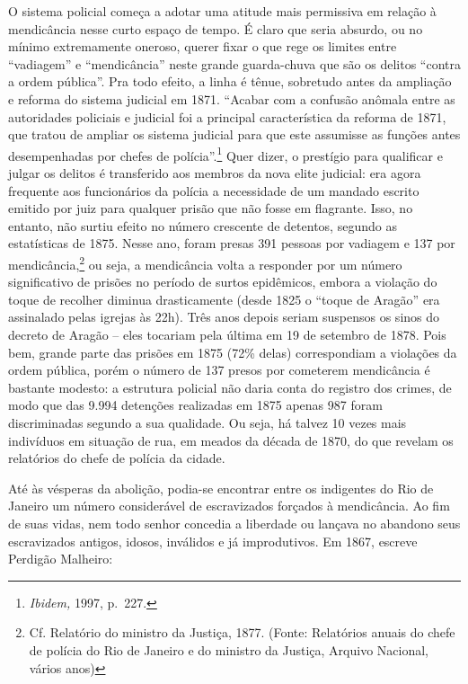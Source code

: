 O sistema policial começa a adotar uma atitude mais permissiva em
relação à mendicância nesse curto espaço de tempo. É claro que seria
absurdo, ou no mínimo extremamente oneroso, querer fixar o que rege os
limites entre ``vadiagem'' e ``mendicância'' neste grande guarda-chuva
que são os delitos ``contra a ordem pública''. Pra todo efeito, a linha
é tênue, sobretudo antes da ampliação e reforma do sistema judicial em
1871. ``Acabar com a confusão anômala entre as autoridades policiais e
judicial foi a principal característica da reforma de 1871, que tratou
de ampliar os sistema judicial para que este assumisse as funções antes
desempenhadas por chefes de polícia''.\footnote{\emph{Ibidem,} 1997,
  p.~227.} Quer dizer, o prestígio para qualificar e julgar os delitos é
transferido aos membros da nova elite judicial: era agora frequente aos
funcionários da polícia a necessidade de um mandado escrito emitido por
juiz para qualquer prisão que não fosse em flagrante. Isso, no entanto,
não surtiu efeito no número crescente de detentos, segundo as
estatísticas de 1875. Nesse ano, foram presas 391 pessoas por vadiagem e
137 por mendicância,\footnote{Cf. Relatório do ministro da Justiça,
  1877. (Fonte: Relatórios anuais do chefe de polícia do Rio de Janeiro
  e do ministro da Justiça, Arquivo Nacional, vários anos)} ou seja, a
mendicância volta a responder por um número significativo de prisões no
período de surtos epidêmicos, embora a violação do toque de recolher
diminua drasticamente (desde 1825 o ``toque de Aragão'' era assinalado
pelas igrejas às 22h). Três anos depois seriam suspensos os sinos do
decreto de Aragão -- eles tocariam pela última em 19 de setembro de
1878. Pois bem, grande parte das prisões em 1875 (72\% delas)
correspondiam a violações da ordem pública, porém o número de 137 presos
por cometerem mendicância é bastante modesto: a estrutura policial não
daria conta do registro dos crimes, de modo que das 9.994 detenções
realizadas em 1875 apenas 987 foram discriminadas segundo a sua
qualidade. Ou seja, há talvez 10 vezes mais indivíduos em situação de
rua, em meados da década de 1870, do que revelam os relatórios do chefe
de polícia da cidade.

Até às vésperas da abolição, podia-se encontrar entre os indigentes do
Rio de Janeiro um número considerável de escravizados forçados à
mendicância. Ao fim de suas vidas, nem todo senhor concedia a liberdade
ou lançava no abandono seus escravizados antigos, idosos, inválidos e já
improdutivos. Em 1867, escreve Perdigão Malheiro:

